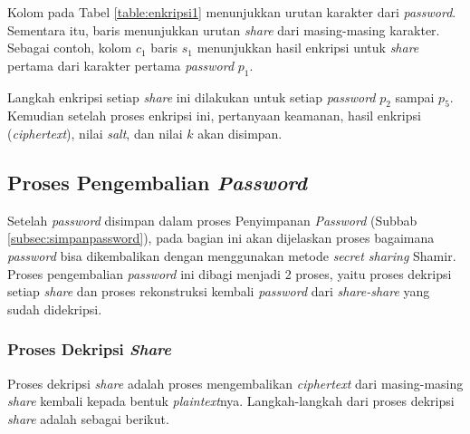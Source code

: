 Kolom pada Tabel \ref{table:enkripsi1} menunjukkan urutan karakter dari \textit{password}. Sementara itu, baris menunjukkan urutan \textit{share} dari masing-masing karakter. Sebagai contoh, kolom $c_1$ baris $s_1$ menunjukkan hasil enkripsi untuk \textit{share} pertama dari karakter pertama \textit{password} $p_1$.

Langkah enkripsi setiap \textit{share} ini dilakukan untuk setiap \textit{password} \begin{math}p_2\end{math} sampai \begin{math}p_5\end{math}. Kemudian setelah proses enkripsi ini, pertanyaan keamanan, hasil enkripsi (\textit{ciphertext}), nilai \textit{salt}, dan nilai \begin{math}k\end{math} akan disimpan.

\subsection{Proses Pengembalian \textit{Password}}

Setelah \textit{password} disimpan dalam proses Penyimpanan \textit{Password} (Subbab \ref{subsec:simpanpassword}), pada bagian ini akan dijelaskan proses bagaimana \textit{password} bisa dikembalikan dengan menggunakan metode \textit{secret sharing} Shamir. Proses pengembalian \textit{password} ini dibagi menjadi 2 proses, yaitu proses dekripsi setiap \textit{share} dan proses rekonstruksi kembali \textit{password} dari \textit{share-share} yang sudah didekripsi.

\subsubsection{Proses Dekripsi \textit{Share}}

Proses dekripsi \textit{share} adalah proses mengembalikan \textit{ciphertext} dari masing-masing \textit{share} kembali kepada bentuk \textit{plaintext}nya. Langkah-langkah dari proses dekripsi \textit{share} adalah sebagai berikut.


